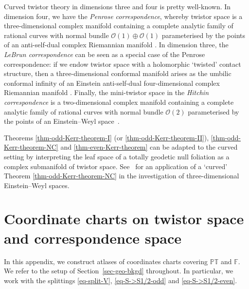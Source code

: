 \documentclass[pdftex]{sigma}
\numberwithin{equation}{section}
\newcommand{\mc} [1]{\mathcal{#1}}
\newcommand{\PT} {\mathbb{PT}}
\newcommand{\F} {\mathbb{F}}
\begin{document}
Curved twistor theory in dimensions three and four is pretty well-known. In dimension four, we have the \emph{Penrose correspondence}, whereby twistor space is a three-dimensional complex manifold containing a complete analytic family of rational curves with normal bundle $\mc{O}(1)\oplus \mc{O}(1)$ parameterised by the points of an anti-self-dual complex Riemannian manifold \cite{Penrose1976}. In dimension three, the \emph{LeBrun correspondence} can be seen as a special case of the Penrose correspondence: if we endow twistor space with a holomorphic `twisted' contact structure, then a three-dimensional conformal manifold arises as the umbilic conformal inf\/inity of an Einstein anti-self-dual four-dimensional complex Riemannian manifold \cite{LeBrun1982}. Finally, the mini-twistor space in the \emph{Hitchin correspondence} is a two-dimensional complex manifold containing a complete analytic family of rational curves with normal bundle $\mc{O}(2)$ parameterised by the points of an Einstein--Weyl space~\mbox{\cite{Hitchin1982a,Jones1985}}.

Theorems \ref{thm-odd-Kerr-theorem-I} (or \ref{thm-odd-Kerr-theorem-II}), \ref{thm-odd-Kerr-theorem-NC} and \ref{thm-even-Kerr-theorem} can be adapted to the curved setting by interpreting the leaf space of a totally geodetic null foliation as a complex submanifold of twistor space. See~\cite{Calderbank2000} for an application of a `curved' Theorem \ref{thm-odd-Kerr-theorem-NC} in the investigation of three-dimensional Einstein--Weyl spaces.

\appendix
\section{Coordinate charts on twistor space and correspondence space}\label{app-cover}
In this appendix, we construct atlases of coordinates charts covering $\PT$ and $\F$. We refer to the setup of Section~\ref{sec-geo-bkgd} throughout. In particular, we work with the splittings \eqref{eq-split-V}, \eqref{eq-S->S1/2-odd} and \eqref{eq-S->S1/2-even}.
\end{document}
